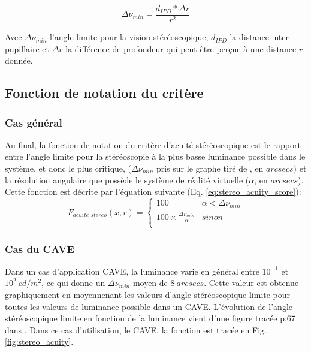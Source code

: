 	\begin{equation}	
		\Delta \nu_{min} = \frac{d_{IPD} * \Delta r}{r^2}
		\label{eq:limiting_angle}
	\end{equation}
	
	\par Avec $\Delta \nu_{min}$ l'angle limite pour la vision stéréoscopique, $d_{IPD}$ la distance inter-pupillaire et $\Delta r$ la différence de profondeur qui peut être perçue à une distance $r$ donnée.
	
	\subsection{Fonction de notation du critère}

	\subsubsection{Cas général}	
	\par Au final, la fonction de notation du critère d'acuité stéréoscopique est le rapport entre l'angle limite pour la stéréoscopie à la plus basse luminance possible dans le système, et donc le plus critique, ($\Delta \nu_{min}$ pris sur le graphe tiré de  \citep{gross_human_2008}, en $arcsecs$) et la résolution angulaire que possède le système de réalité virtuelle ($\alpha$, en $arcsecs$). Cette fonction est décrite par l'équation suivante (Eq. \ref{eq:stereo_acuity_score}):
	\begin{equation}
		F_{acuite\_stereo}(x,r) = \begin{cases}
		100 & \alpha < \Delta \nu_{min}\\
		100 \times \frac{\Delta \nu_{min}}{\alpha} & sinon\\
		\end{cases}
		\label{eq:stereo_acuity_score}
	\end{equation}
	
	\subsubsection{Cas du CAVE}	
	\par Dans un cas d'application CAVE, la luminance varie en général entre $10^{-1}$ et $10^{2}~cd/m^2$, ce qui donne un $\Delta \nu_{min}$ moyen de $8~arcsecs$. Cette valeur est obtenue graphiquement en moyennenant les valeurs d'angle stéréoscopique limite pour toutes les valeurs de luminance possible dans un CAVE. L'évolution de l'angle stéréoscopique limite en fonction de la luminance vient d'une figure tracée p.67 dans \citep{gross_human_2008}. Dans ce cas d'utilisation, le CAVE, la fonction est tracée en Fig. \ref{fig:stereo_acuity}.
	
